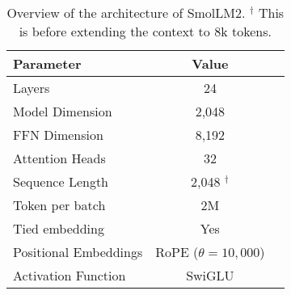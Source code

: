 \begin{table}[h!]
\centering
\caption{Overview of the architecture of SmolLM2. $^\dagger$ This is before extending the context to 8k tokens.}
\label{tab:model_config}
\begin{tabular}{@{}lcc@{}}
\toprule
\textbf{Parameter}          & \textbf{Value} \\ \midrule
Layers                      & 24            \\
Model Dimension             & 2,048         \\
FFN Dimension               & 8,192         \\
Attention Heads             & 32            \\
Sequence Length             & 2,048 $^\dagger$        \\
Token per batch        & 2M \\
Tied embedding              & Yes         \\                  
Positional Embeddings       & RoPE ($\theta = 10,000$) \\
Activation Function         & SwiGLU          \\ \bottomrule
\end{tabular}
\end{table}